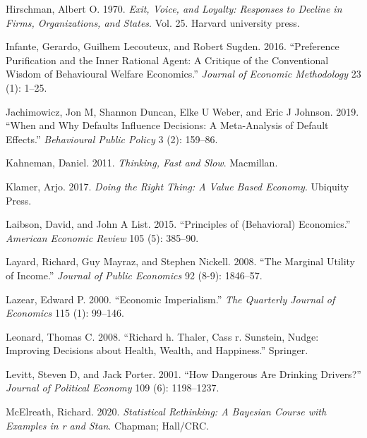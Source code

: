 \documentclass[
]{book}
\newlength{\cslhangindent}
\newlength{\cslentryspacingunit} %
\newenvironment{CSLReferences}[2] %
 {%
  \setlength{\parindent}{0pt}
  \ifodd #1
  \let\oldpar\par
  \def\par{\hangindent=\cslhangindent\oldpar}
  \fi
  \setlength{\parskip}{#2\cslentryspacingunit}
 }%
 {}
\begin{document}
\begin{CSLReferences}{1}{0}
\leavevmode{}%
Hirschman, Albert O. 1970. \emph{Exit, Voice, and Loyalty: Responses to Decline in Firms, Organizations, and States}. Vol. 25. Harvard university press.

\leavevmode{}%
Infante, Gerardo, Guilhem Lecouteux, and Robert Sugden. 2016. {``Preference Purification and the Inner Rational Agent: A Critique of the Conventional Wisdom of Behavioural Welfare Economics.''} \emph{Journal of Economic Methodology} 23 (1): 1--25.

\leavevmode{}%
Jachimowicz, Jon M, Shannon Duncan, Elke U Weber, and Eric J Johnson. 2019. {``When and Why Defaults Influence Decisions: A Meta-Analysis of Default Effects.''} \emph{Behavioural Public Policy} 3 (2): 159--86.

\leavevmode{}%
Kahneman, Daniel. 2011. \emph{Thinking, Fast and Slow}. Macmillan.

\leavevmode{}%
Klamer, Arjo. 2017. \emph{Doing the Right Thing: A Value Based Economy}. Ubiquity Press.

\leavevmode{}%
Laibson, David, and John A List. 2015. {``Principles of (Behavioral) Economics.''} \emph{American Economic Review} 105 (5): 385--90.

\leavevmode{}%
Layard, Richard, Guy Mayraz, and Stephen Nickell. 2008. {``The Marginal Utility of Income.''} \emph{Journal of Public Economics} 92 (8-9): 1846--57.

\leavevmode{}%
Lazear, Edward P. 2000. {``Economic Imperialism.''} \emph{The Quarterly Journal of Economics} 115 (1): 99--146.

\leavevmode{}%
Leonard, Thomas C. 2008. {``Richard h. Thaler, Cass r. Sunstein, Nudge: Improving Decisions about Health, Wealth, and Happiness.''} Springer.

\leavevmode{}%
Levitt, Steven D, and Jack Porter. 2001. {``How Dangerous Are Drinking Drivers?''} \emph{Journal of Political Economy} 109 (6): 1198--1237.

\leavevmode{}%
McElreath, Richard. 2020. \emph{Statistical Rethinking: A Bayesian Course with Examples in r and Stan}. Chapman; Hall/CRC.


\end{CSLReferences}
\end{document}
